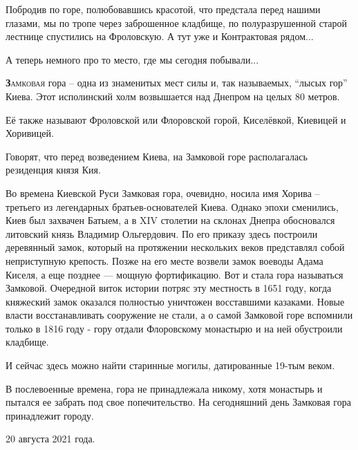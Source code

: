 
Побродив по горе, полюбовавшись красотой, что предстала перед нашими глазами, мы
по тропе через заброшенное кладбище, по полуразрушенной старой лестнице
спустились на Фроловскую. А тут уже и Контрактовая рядом...


А теперь немного про то место, где мы сегодня побывали...

\lettrine[lraise=0.1, nindent=0em, slope=-.5em, lines=2]{\textbf{З}}{амковая}
гора – одна из знаменитых мест силы и, так называемых, \enquote{лысых гор}
Киева. Этот исполинский холм возвышается над Днепром на целых 80 метров.

Её также называют Фроловской или Флоровской горой, Киселёвкой, Киевицей и
Хоривицей.

Говорят, что перед возведением Киева, на Замковой горе располагалась резиденция
князя Кия. 

Во времена Киевской Руси Замковая гора, очевидно, носила имя Хорива – третьего
из легендарных братьев-основателей Киева. Однако эпохи сменились, Киев был
захвачен Батыем, а в XIV столетии на склонах Днепра обосновался литовский князь
Владимир Ольгердович. По его приказу здесь построили деревянный замок, который
на протяжении нескольких веков представлял собой неприступную крепость. Позже
на его месте возвели замок воеводы Адама Киселя, а еще позднее — мощную
фортификацию. Вот и стала гора называться Замковой. Очередной виток истории
потряс эту местность в 1651 году, когда княжеский замок оказался полностью
уничтожен восставшими казаками. Новые власти восстанавливать сооружение не
стали, а о самой Замковой горе вспомнили только в 1816 году  - гору отдали
Флоровскому монастырю и на ней обустроили кладбище.

И сейчас здесь можно найти старинные могилы, датированные 19-тым веком.

В послевоенные времена, гора не принадлежала никому, хотя монастырь и пытался
ее забрать под свое попечительство. На сегодняшний день Замковая гора
принадлежит городу.

20 августа 2021 года.
